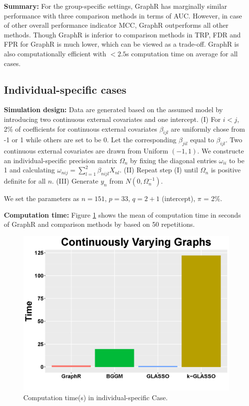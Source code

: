 \documentclass[
]{book}
\begin{document}
\textbf{Summary:} For the group-specific settings, GraphR has marginally similar performance with three comparison methods in terms of AUC. However, in case of other overall performance indicator MCC, GraphR outperforms all other methods. Though GraphR is inferior to comparison methods in TRP, FDR and FPR for GraphR is much lower, which can be viewed as a trade-off. GraphR is also computationally efficient with \(<2.5\)s computation time on average for all cases.

\hypertarget{simcont}{%
\subsection{Individual-specific cases}\label{simcont}}

\textbf{Simulation design:}
Data are generated based on the assumed model by introducing two continuous external covariates and one intercept. (I) For \(i < j\), 2\% of coefficients for continuous external covariates \(\beta_{ijl}\) are uniformly chose from -1 or 1 while others are set to be 0. Let the corresponding \(\beta_{jil}\) equal to \(\beta_{ijl}\). Two continuous external covariates are drawn from Uniform \((-1,1)\). We constructe an individual-specific precision matrix \(\Omega_n\) by fixing the diagonal entries \(\omega_{ii}\) to be 1 and calculating \(\omega_{nij} = \sum_{l=1}^2\beta_{nijl}X_{nl}\). (II) Repeat step (I) until \(\Omega_n\) is positive definite for all \(n\). (III) Generate \(y_n\) from \(N(0, \Omega_n^{-1})\).

We set the parameters as \(n = 151\), \(p = 33\), \(q = 2 + 1\) (intercept), \(\pi\) = 2\%.

\textbf{Computation time: }
Figure \ref{fig:conttime} shows the mean of computation time in seconds of GraphR and comparison methods by based on 50 repetitions.

\begin{figure}

{\centering \includegraphics[width=0.5\linewidth]{images/cont_time} 

}

\caption{Computation time(s) in  individual-specific Case.}\label{fig:conttime}
\end{figure}
\end{document}

